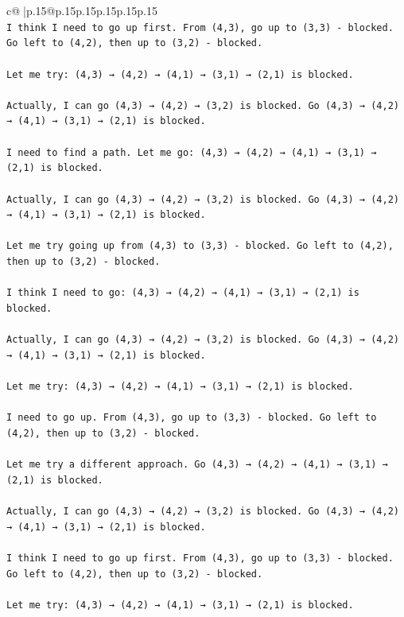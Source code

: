 \documentclass{article}
\begin{document}
{\begin{supertabular}{c@{$\;$}|p{.15\linewidth}@{}p{.15\linewidth}p{.15\linewidth}p{.15\linewidth}p{.15\linewidth}p{.15\linewidth}}
{{{\\ 
\texttt{I think I need to go up first. From (4,3), go up to (3,3) {-} blocked. Go left to (4,2), then up to (3,2) {-} blocked. } \\
\\ 
\texttt{Let me try: (4,3) → (4,2) → (4,1) → (3,1) → (2,1) is blocked. } \\
\\ 
\texttt{Actually, I can go (4,3) → (4,2) → (3,2) is blocked. Go (4,3) → (4,2) → (4,1) → (3,1) → (2,1) is blocked.} \\
\\ 
\texttt{I need to find a path. Let me go: (4,3) → (4,2) → (4,1) → (3,1) → (2,1) is blocked. } \\
\\ 
\texttt{Actually, I can go (4,3) → (4,2) → (3,2) is blocked. Go (4,3) → (4,2) → (4,1) → (3,1) → (2,1) is blocked.} \\
\\ 
\texttt{Let me try going up from (4,3) to (3,3) {-} blocked. Go left to (4,2), then up to (3,2) {-} blocked. } \\
\\ 
\texttt{I think I need to go: (4,3) → (4,2) → (4,1) → (3,1) → (2,1) is blocked. } \\
\\ 
\texttt{Actually, I can go (4,3) → (4,2) → (3,2) is blocked. Go (4,3) → (4,2) → (4,1) → (3,1) → (2,1) is blocked.} \\
\\ 
\texttt{Let me try: (4,3) → (4,2) → (4,1) → (3,1) → (2,1) is blocked. } \\
\\ 
\texttt{I need to go up. From (4,3), go up to (3,3) {-} blocked. Go left to (4,2), then up to (3,2) {-} blocked. } \\
\\ 
\texttt{Let me try a different approach. Go (4,3) → (4,2) → (4,1) → (3,1) → (2,1) is blocked. } \\
\\ 
\texttt{Actually, I can go (4,3) → (4,2) → (3,2) is blocked. Go (4,3) → (4,2) → (4,1) → (3,1) → (2,1) is blocked.} \\
\\ 
\texttt{I think I need to go up first. From (4,3), go up to (3,3) {-} blocked. Go left to (4,2), then up to (3,2) {-} blocked. } \\
\\ 
\texttt{Let me try: (4,3) → (4,2) → (4,1) → (3,1) → (2,1) is blocked. } \\
}}}
\end{supertabular}}
\end{document}
